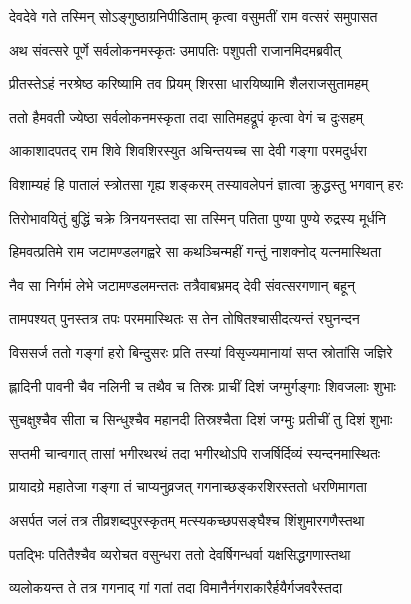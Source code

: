 
\twolineshloka
{देवदेवे गते तस्मिन् सोऽङ्गुष्ठाग्रनिपीडिताम्}
{कृत्वा वसुमतीं राम वत्सरं समुपासत} %

\twolineshloka
{अथ संवत्सरे पूर्णे सर्वलोकनमस्कृतः}
{उमापतिः पशुपती राजानमिदमब्रवीत्} %

\twolineshloka
{प्रीतस्तेऽहं नरश्रेष्ठ करिष्यामि तव प्रियम्}
{शिरसा धारयिष्यामि शैलराजसुतामहम्} %

\twolineshloka
{ततो हैमवती ज्येष्ठा सर्वलोकनमस्कृता}
{तदा सातिमहद्रूपं कृत्वा वेगं च दुःसहम्} %

\twolineshloka
{आकाशादपतद् राम शिवे शिवशिरस्युत}
{अचिन्तयच्च सा देवी गङ्गा परमदुर्धरा} %

\twolineshloka
{विशाम्यहं हि पातालं स्त्रोतसा गृह्य शङ्करम्}
{तस्यावलेपनं ज्ञात्वा क्रुद्धस्तु भगवान् हरः} %

\twolineshloka
{तिरोभावयितुं बुद्धिं चक्रे त्रिनयनस्तदा}
{सा तस्मिन् पतिता पुण्या पुण्ये रुद्रस्य मूर्धनि} %

\twolineshloka
{हिमवत्प्रतिमे राम जटामण्डलगह्वरे}
{सा कथञ्चिन्महीं गन्तुं नाशक्नोद् यत्नमास्थिता} %

\twolineshloka
{नैव सा निर्गमं लेभे जटामण्डलमन्ततः}
{तत्रैवाबभ्रमद् देवी संवत्सरगणान् बहून्} %

\twolineshloka
{तामपश्यत् पुनस्तत्र तपः परममास्थितः}
{स तेन तोषितश्चासीदत्यन्तं रघुनन्दन} %

\twolineshloka
{विससर्ज ततो गङ्गां हरो बिन्दुसरः प्रति}
{तस्यां विसृज्यमानायां सप्त स्रोतांसि जज्ञिरे} %

\twolineshloka
{ह्लादिनी पावनी चैव नलिनी च तथैव च}
{तिस्रः प्राचीं दिशं जग्मुर्गङ्गाः शिवजलाः शुभाः} %

\twolineshloka
{सुचक्षुश्चैव सीता च सिन्धुश्चैव महानदी}
{तिस्रश्चैता दिशं जग्मुः प्रतीचीं तु दिशं शुभाः} %

\twolineshloka
{सप्तमी चान्वगात् तासां भगीरथरथं तदा}
{भगीरथोऽपि राजर्षिर्दिव्यं स्यन्दनमास्थितः} %

\twolineshloka
{प्रायादग्रे महातेजा गङ्गा तं चाप्यनुव्रजत्}
{गगनाच्छङ्करशिरस्ततो धरणिमागता} %

\twolineshloka
{असर्पत जलं तत्र तीव्रशब्दपुरस्कृतम्}
{मत्स्यकच्छपसङ्घैश्च शिंशुमारगणैस्तथा} %

\twolineshloka
{पतद्भिः पतितैश्चैव व्यरोचत वसुन्धरा}
{ततो देवर्षिगन्धर्वा यक्षसिद्धगणास्तथा} %

\twolineshloka
{व्यलोकयन्त ते तत्र गगनाद् गां गतां तदा}
{विमानैर्नगराकारैर्हयैर्गजवरैस्तदा} %

